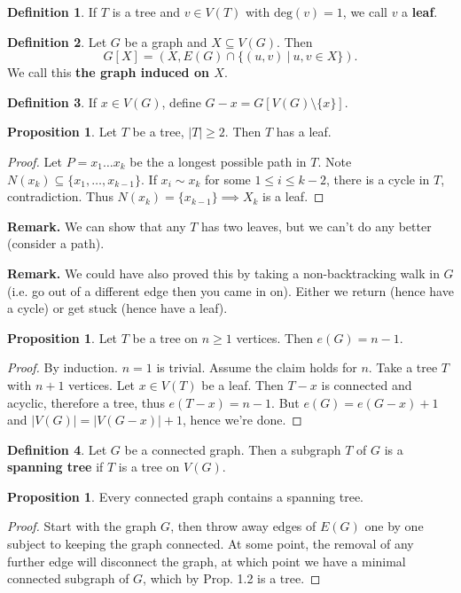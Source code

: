 \documentclass{article}
\theoremstyle{definition}
\newtheorem{prop}[theorem]{Proposition}
\newtheorem{defn}{Definition}[section]
\begin{document}
\begin{defn}
    If $T$ is a tree and $v \in V(T)$ with $\text{deg}(v) = 1$, we call $v$ a \textbf{leaf}.
\end{defn}
\begin{defn}
    Let $G$ be a graph and $X \subseteq V(G)$. Then $$G[X] = (X, E(G) \cap \{(u,v)~|~ u,v \in X\}).$$ We call this \textbf{the graph induced on $X$}. 
\end{defn}
\begin{defn}
    If $x \in V(G)$, define $G-x = G[V(G) \setminus \{x\}]$.
\end{defn}
\begin{prop}
    Let $T$ be a tree, $|T|\ge 2$. Then $T$ has a leaf.
\end{prop}
\begin{proof}
    Let $P = x_1\ldots x_k$ be the a longest possible path in $T$. Note $N(x_k) \subseteq \{x_1,\ldots,x_{k-1}\}$. If $x_i \sim x_k$ for some $1\le i\le k-2$, there is a cycle in $T$, contradiction. Thus $N(x_k) = \{x_{k-1}\} \implies X_k$ is a leaf.
\end{proof}
\textbf{Remark.} We can show that any $T$ has two leaves, but we can't do any better (consider a path).

\textbf{Remark.} We could have also proved this by taking a non-backtracking walk in $G$ (i.e. go out of a different edge then you came in on). Either we return (hence have a cycle) or get stuck (hence have a leaf).

\begin{prop}
    Let $T$ be a tree on $n\ge 1$ vertices. Then $e(G) = n-1$.
\end{prop}
\begin{proof}
    By induction. $n=1$ is trivial. Assume the claim holds for $n$. Take a tree $T$ with $n+1$ vertices. Let $x \in V(T)$ be a leaf. Then $T-x$ is connected and acyclic, therefore a tree, thus $e(T-x) = n-1$. But $e(G) = e(G-x)+1$ and $|V(G)| = |V(G-x)|+1$, hence we're done. 
\end{proof}
\begin{defn}
    Let $G$ be a connected graph. Then a subgraph $T$ of $G$ is a \textbf{spanning tree} if $T$ is a tree on $V(G)$.
\end{defn}
\begin{prop}
    Every connected graph contains a spanning tree.
\end{prop}
\begin{proof}
    Start with the graph $G$, then throw away edges of $E(G)$ one by one subject to keeping the graph connected. At some point, the removal of any further edge will disconnect the graph, at which point we have a minimal connected subgraph of $G$, which by Prop. 1.2 is a tree.
\end{proof}
\end{document}

